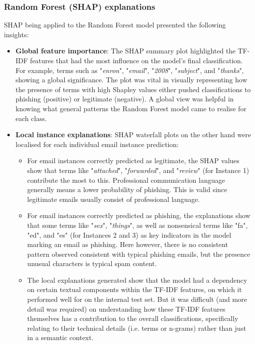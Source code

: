 
\subsubsection*{Random Forest (SHAP) explanations}
SHAP being applied to the Random Forest model presented the following insights:

\begin{itemize}
  \item \textbf{Global feature importance}: The SHAP summary plot highlighted the TF-IDF features that had the most influence on the model's final classification. For example, terms such as "\textit{enron}", "\textit{email}", "\textit{2008}", "\textit{subject}", and "\textit{thanks}", showing a global significance. The plot was vital in visually representing how the presence of terms with high Shapley values either pushed classifications to phishing (positive) or legitimate (negative). A global view was helpful in knowing what general patterns the Random Forest model came to realise for each class.
  \item \textbf{Local instance explanations}: SHAP waterfall plots on the other hand were localised for each individual email instance prediction:
  \begin{itemize}
    \item For email instances correctly predicted as legitimate, the SHAP values show that terms like "\textit{attached}", "\textit{forwarded}", and "\textit{review}" (for Instance 1) contribute the most to this. Professional communication language generally means a lower probability of phishing. This is valid since legitimate emails usually consist of professional language.
    \item For email instances correctly predicted as phishing, the explanations show that some terms like "\textit{sex}", "\textit{things}", as well as nonsensical terms like "fa", "ed", and "es" (for Instances 2 and 3) as key indicators in the model marking an email as phishing. Here however, there is no consistent pattern observed consistent with typical phishing emails, but the presence unusual characters is typical spam content.
    \item The local explanations generated show that the model had a dependency on certain textual components within the TF-IDF features, on which it performed well for on the internal test set. But it was difficult (and more detail was required) on understanding how these TF-IDF features themselves has a contribution to the overall classifications, specifically relating to their technical details (i.e. terms or n-grams) rather than just in a semantic context.
  \end{itemize}
\end{itemize}
